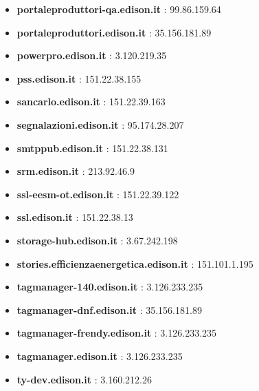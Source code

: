\documentclass{article}
\begin{document}
\begin{itemize}
            \item \textbf{ portaleproduttori-qa.edison.it }: 99.86.159.64
        
            \item \textbf{ portaleproduttori.edison.it }: 35.156.181.89
        
            \item \textbf{ powerpro.edison.it }: 3.120.219.35
        
            \item \textbf{ pss.edison.it }: 151.22.38.155
        
            \item \textbf{ sancarlo.edison.it }: 151.22.39.163
        
            \item \textbf{ segnalazioni.edison.it }: 95.174.28.207
        
            \item \textbf{ smtppub.edison.it }: 151.22.38.131
        
            \item \textbf{ srm.edison.it }: 213.92.46.9
        
            \item \textbf{ ssl-eesm-ot.edison.it }: 151.22.39.122
        
            \item \textbf{ ssl.edison.it }: 151.22.38.13
        
            \item \textbf{ storage-hub.edison.it }: 3.67.242.198
        
            \item \textbf{ stories.efficienzaenergetica.edison.it }: 151.101.1.195
        
            \item \textbf{ tagmanager-140.edison.it }: 3.126.233.235
        
            \item \textbf{ tagmanager-dnf.edison.it }: 35.156.181.89
        
            \item \textbf{ tagmanager-frendy.edison.it }: 3.126.233.235
        
            \item \textbf{ tagmanager.edison.it }: 3.126.233.235
        
            \item \textbf{ ty-dev.edison.it }: 3.160.212.26
        

\end{itemize}
\end{document}
